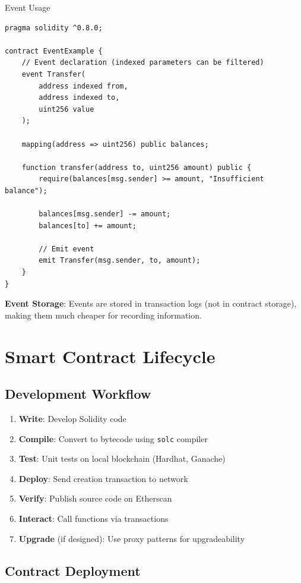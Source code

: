 \documentclass[11pt,a4paper]{article}
\begin{document}
\begin{examplebox}{Event Usage}
\begin{lstlisting}[language=Solidity]
pragma solidity ^0.8.0;

contract EventExample {
    // Event declaration (indexed parameters can be filtered)
    event Transfer(
        address indexed from,
        address indexed to,
        uint256 value
    );

    mapping(address => uint256) public balances;

    function transfer(address to, uint256 amount) public {
        require(balances[msg.sender] >= amount, "Insufficient balance");

        balances[msg.sender] -= amount;
        balances[to] += amount;

        // Emit event
        emit Transfer(msg.sender, to, amount);
    }
}
\end{lstlisting}

\textbf{Event Storage}: Events are stored in transaction logs (not in contract storage), making them much cheaper for recording information.
\end{examplebox}

\section{Smart Contract Lifecycle}

\subsection{Development Workflow}

\begin{enumerate}
  \item \textbf{Write}: Develop Solidity code
  \item \textbf{Compile}: Convert to bytecode using \texttt{solc} compiler
  \item \textbf{Test}: Unit tests on local blockchain (Hardhat, Ganache)
  \item \textbf{Deploy}: Send creation transaction to network
  \item \textbf{Verify}: Publish source code on Etherscan
  \item \textbf{Interact}: Call functions via transactions
  \item \textbf{Upgrade} (if designed): Use proxy patterns for upgradeability
\end{enumerate}

\subsection{Contract Deployment}
\end{document}
